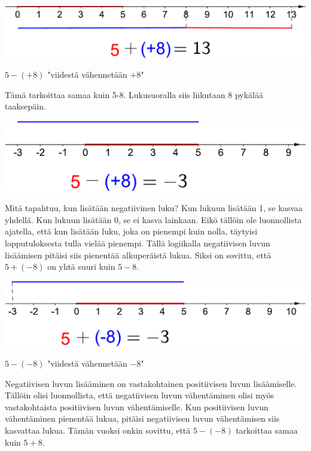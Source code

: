     \begin{center}
    \includegraphics[scale=0.5]{01-luvut/kuvia/5plusplus8on13-crop.pdf}
    \end{center}
    
    $5-(+8)$ "viidestä vähennetään $+8$"
    
    Tämä tarkoittaa samaa kuin 5-8. Lukusuoralla siis liikutaan 8 pykälää taaksepäin.
    
    \begin{center}
    \includegraphics[scale=0.5]{01-luvut/kuvia/5miinusplus8onmiinus3-crop.pdf}
    \end{center}
    
    Mitä tapahtuu, kun lisätään negatiivinen luku? Kun lukuun lisätään 1, se kasvaa yhdellä. Kun lukuun lisätään 0, se ei kasva lainkaan. Eikö tällöin ole luonnollista ajatella, että kun lisätään luku, joka on pienempi kuin nolla, täytyisi lopputuloksesta tulla vielää pienempi. Tällä logiikalla negatiivisen luvun lisäämisen pitäisi siis pienentää alkuperäistä lukua. Siksi on sovittu, että $5+(-8)$ on yhtä suuri kuin $5-8$.
    
    \begin{center}
    \includegraphics[scale=0.5]{01-luvut/kuvia/5plusmiinus8onmiinus3-crop.pdf}
    \end{center}
    
    $5-(-8)$ "viidestä vähennetään $-8$"
    
    Negatiivisen luvun lisääminen on vastakohtainen positiivisen luvun lisäämiselle. Tällöin olisi luonnollista, että negatiivisen luvun vähentäminen olisi myös vastakohtaista positiivisen luvun vähentämiselle. Kun positiivisen luvun vähentäminen pienentää lukua, pitäisi negatiivisen luvun vähentämisen siis kasvattaa lukua. Tämän vuoksi onkin sovittu, että $5-(-8)$ tarkoittaa samaa kuin $5+8$.
    
